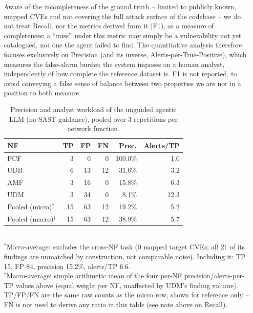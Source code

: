 Aware of the incompleteness of the ground truth -- limited to publicly
known, mapped CVEs and not covering the full attack surface of the
codebase -- we do not treat Recall, nor the metrics derived from it
(F1), as a measure of completeness: a ``miss'' under this metric may
simply be a vulnerability not yet catalogued, not one the agent failed
to find. The quantitative analysis therefore focuses exclusively on
Precision (and its inverse, Alerts-per-True-Positive), which measures
the false-alarm burden the system imposes on a human analyst,
independently of how complete the reference dataset is. F1 is not
reported, to avoid conveying a false sense of balance between two
properties we are not in a position to both measure.

\begin{table}[t]
\centering
\caption{Precision and analyst workload of the unguided agentic LLM (no SAST guidance), pooled over 3 repetitions per network function.}
\label{tab:detection-no-sast}
\begin{tabular}{lrrrrr}
\toprule
NF & TP & FP & FN & Prec. & Alerts/TP \\
\midrule
PCF & 3  & 0  & 0  & 100.0\% & 1.0 \\
UDR & 6  & 13 & 12 & 31.6\%  & 3.2 \\
AMF & 3  & 16 & 0  & 15.8\%  & 6.3 \\
UDM & 3  & 34 & 0  & 8.1\%   & 12.3 \\
\midrule
Pooled (micro)$^{*}$ & 15 & 63 & 12 & 19.2\% & 5.2 \\
Pooled (macro)$^{\dagger}$ & 15 & 63 & 12 & 38.9\% & 5.7 \\
\bottomrule
\end{tabular}
\\[2pt]
\footnotesize{$^{*}$Micro-average: excludes the cross-NF task (0 mapped target CVEs; all 21 of its findings are unmatched by construction, not comparable noise). Including it: TP 15, FP 84, precision 15.2\%, alerts/TP 6.6.\\
$^{\dagger}$Macro-average: simple arithmetic mean of the four per-NF precision/alerts-per-TP values above (equal weight per NF, unaffected by UDM's finding volume). TP/FP/FN are the same raw counts as the micro row, shown for reference only -- FN is not used to derive any ratio in this table (see note above on Recall).}
\end{table}

